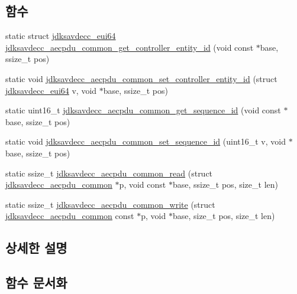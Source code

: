 \subsection*{함수}
\begin{DoxyCompactItemize}
\item 
static struct \hyperlink{structjdksavdecc__eui64}{jdksavdecc\+\_\+eui64} \hyperlink{group__aecpdu__common_ga39f2e24c3c2a66121dd48a25c5c250bc}{jdksavdecc\+\_\+aecpdu\+\_\+common\+\_\+get\+\_\+controller\+\_\+entity\+\_\+id} (void const $\ast$base, ssize\+\_\+t pos)
\item 
static void \hyperlink{group__aecpdu__common_ga5eb29ca4c6d9dc424e108e99132d4ec7}{jdksavdecc\+\_\+aecpdu\+\_\+common\+\_\+set\+\_\+controller\+\_\+entity\+\_\+id} (struct \hyperlink{structjdksavdecc__eui64}{jdksavdecc\+\_\+eui64} v, void $\ast$base, ssize\+\_\+t pos)
\item 
static uint16\+\_\+t \hyperlink{group__aecpdu__common_ga4c5015b65543e4753c336d98b63fea28}{jdksavdecc\+\_\+aecpdu\+\_\+common\+\_\+get\+\_\+sequence\+\_\+id} (void const $\ast$base, ssize\+\_\+t pos)
\item 
static void \hyperlink{group__aecpdu__common_gab9f7895d1c5befd0b2965510dfe66533}{jdksavdecc\+\_\+aecpdu\+\_\+common\+\_\+set\+\_\+sequence\+\_\+id} (uint16\+\_\+t v, void $\ast$base, ssize\+\_\+t pos)
\item 
static ssize\+\_\+t \hyperlink{group__aecpdu__common_ga78dffab7a5f742e72d9c58ed9962f1a9}{jdksavdecc\+\_\+aecpdu\+\_\+common\+\_\+read} (struct \hyperlink{structjdksavdecc__aecpdu__common}{jdksavdecc\+\_\+aecpdu\+\_\+common} $\ast$p, void const $\ast$base, ssize\+\_\+t pos, size\+\_\+t len)
\item 
static ssize\+\_\+t \hyperlink{group__aecpdu__common_gac85377ae2518276697173afa5db77526}{jdksavdecc\+\_\+aecpdu\+\_\+common\+\_\+write} (struct \hyperlink{structjdksavdecc__aecpdu__common}{jdksavdecc\+\_\+aecpdu\+\_\+common} const $\ast$p, void $\ast$base, size\+\_\+t pos, size\+\_\+t len)
\end{DoxyCompactItemize}


\subsection{상세한 설명}


\subsection{함수 문서화}

